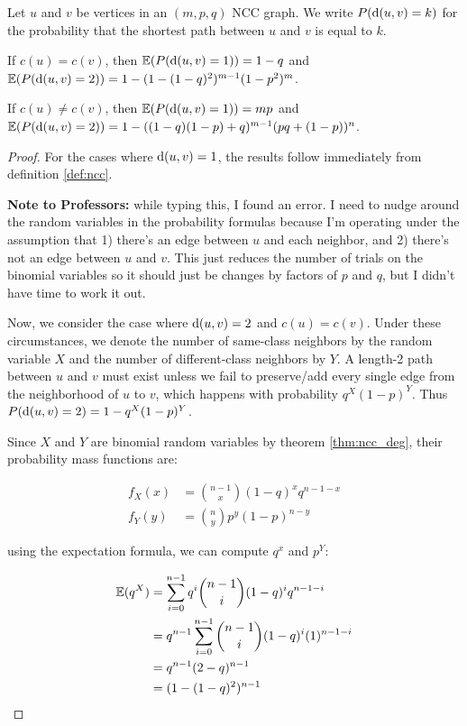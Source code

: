 \begin{theorem}
  Let $u$ and $v$ be vertices in an $(m,p,q)$ NCC graph. We write $P(\mathrm{d}(u,v) = k)$ for the probability
  that the shortest path between $u$ and $v$ is equal to $k$.

  If $c(u) = c(v)$, then $\mathbb{E}(P(\mathrm{d}(u,v) = 1)) = 1-q$ and
  $\mathbb{E}(P(\mathrm{d}(u,v) = 2)) = 1- (1 - (1-q)^2)^{m-1} (1-p^2)^{m}$.

  If $c(u) \neq c(v)$, then $\mathbb{E}(P(\mathrm{d}(u,v) = 1)) = mp$ and
  $\mathbb{E}(P(\mathrm{d}(u,v) = 2)) = 1- ((1-q)(1-p) + q)^{m-1}(pq+(1-p))^n$.
\end{theorem}
\begin{proof}
  For the cases where $\mathrm{d}(u,v) = 1$, the results follow immediately from definition \ref{def:ncc}.

  \textbf{Note to Professors:} while typing this, I found an error. I need to nudge around the random
  variables in the probability formulas because I'm operating under the assumption that 1) there's an
  edge between $u$ and each neighbor, and 2) there's not an edge between $u$ and $v$. This just
  reduces the number of trials on the binomial variables so it should just be changes by factors of $p$
  and $q$, but I didn't have time to work it out.

  Now, we consider the case where $\mathrm{d}(u,v) = 2$ and $c(u) = c(v)$. Under these circumstances, we
  denote the number of same-class neighbors by the random variable $X$ and the number of
  different-class neighbors by $Y$. A length-2 path between $u$ and $v$ must exist unless we fail to
  preserve/add every single edge from the neighborhood of $u$ to $v$, which happens with probability
  $q^X(1-p)^Y$. Thus $P(\mathrm{d}(u,v) = 2) = 1 - q^X(1-p)^Y$.

  Since $X$ and $Y$ are binomial random variables by theorem \ref{thm:ncc_deg}, their probability mass
  functions are:

  \begin{align*}
    f_X(x) &= {n-1 \choose x} (1-q)^xq^{n-1-x} \\
    f_Y(y) &= {n \choose y} p^y(1-p)^{n-y}
  \end{align*}

  using the expectation formula, we can compute $q^x$ and $p^Y$:

  \begin{align*}
    \mathbb{E}(q^X) &= \sum_{i=0}^{n-1}q^i{n-1 \choose i}(1-q)^iq^{n-1-i} \\
            &= q^{n-1}\sum_{i=0}^{n-1}{n-1 \choose i}(1-q)^i(1)^{n-1-i} \\
            &= q^{n-1}(2-q)^{n-1} \\
            &= (1 - (1 - q)^2)^{n-1}
  \end{align*}


\end{proof}
